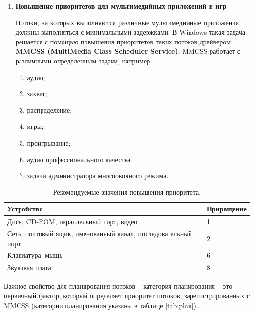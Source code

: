 \begin{enumerate}[label={\arabic*.}]
	
	\item \textbf{Повышение приоритетов для мультимедийных приложений и игр}
	
		Потоки, на которых выполняются различные мультимедийные приложения, должны выполняться с минимальными задержками. В Windows такая задача решается с помощью повышения приоритетов таких потоков драйвером \textbf{MMCSS (MultiMedia Class Scheduler Service)}. MMCSS работает с различными определенным задачи, например:
		\begin{enumerate}[label=\arabic*)]
			\item аудио;
			\item захват;
			\item распределение;
			\item игры;
			\item проигрывание;
			\item аудио профессионального качества
			\item задачи администратора многооконного режима.
		\end{enumerate}
\end{enumerate}

\begin{table}[h!]
	\caption{Рекомендуемые значения повышения приоритета.}
	\begin{center}
		\begin{tabular}{|p{100mm}|l|}
			\hline
			\textbf{Устройство} & \textbf{Приращение} \\
			\hline
			Диск, CD-ROM, параллельный порт, видео & 1 \\
			\hline
			Сеть, почтовый ящик, именованный канал, последовательный порт & 2 \\
			\hline
			Клавиатура, мышь & 6 \\
			\hline
			Звуковая плата & 8 \\
			\hline
		\end{tabular}
	\end{center}
	\label{tab:io}
\end{table}

Важное свойство для планирования потоков -- категория планирования -- это первичный фактор, который определяет приоритет потоков, зарегистрированных с MMCSS (категории планирования указаны в таблице \ref{tab:plan}).

